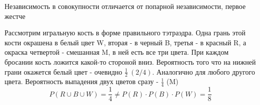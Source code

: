 \documentclass[discrete.tex]{subfiles}
\begin{document}
\begin{remark}
  Независимость в совокупности отличается от попарной независимости, первое жестче
\end{remark}

\begin{example}[С.Н.Бернштейн]
  Рассмотрим игральную кость в форме правильного тэтраэдра. Одна грань этой кости окрашена в белый цвет W, вторая - в черный B, третья - в красный R, а окраска четвертой - смешанная M, в ней есть все три цвета. При каждом бросании кость ложится какой-то стороной вниз. Вероятность того что на нижней грани окажется белый цвет - очевидно $\frac{1}{2}\ (2/4)$. Аналогично для любого другого цвета. Вероятность выпадения двух цветов сразу - $\frac{1}{4}$ (M)
  \[P(R \cup B \cup W) = \frac{1}{4} \neq P(R) \cdot P(B) \cdot P(W) = \frac{1}{8}\]
\end{example}
\end{document}
